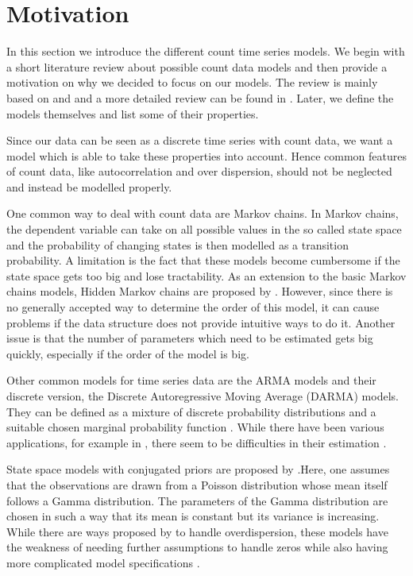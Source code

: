 \section{Motivation}
\label{sec:Ingarch Motivation}

In this section we introduce the different count time series models. We begin with a short literature review about possible count data models and then provide a motivation on why we decided to focus on our models. The review is mainly based on \cite{Liboschik:2016} and \cite{Heinen:2003} and a more detailed review can be found in \cite{Zucchini:1997}. Later, we define the models themselves and list some of their properties. 

Since our data can be seen as a discrete time series with count data, we want a model which is able to take these properties into account. Hence common features of count data, like autocorrelation and over dispersion, should not be neglected and instead be modelled properly.
 
One common way to deal with count data are Markov chains. In Markov chains, the dependent variable can take on all possible values in the so called state space and the probability of changing states is then modelled as a transition probability. A limitation is the fact that these models become cumbersome if the state space gets too big and lose tractability. As an extension to the basic Markov chains models, Hidden Markov chains are proposed by \cite{Zucchini:1997}. However, since there is no generally accepted way to determine the order of this model, it can cause problems if the data structure does not provide intuitive ways to do it. Another issue is that the number of parameters which need to be estimated gets big quickly, especially if the order of the model is big. 

Other common models for time series data are the ARMA models and their discrete version, the Discrete Autoregressive Moving Average (DARMA) models. They can be defined as a mixture of discrete probability distributions and a suitable chosen marginal probability function \cite{Biswas:2009}. While there have been various applications, for example in \cite{Chang:1987}, there seem to be difficulties in their estimation \cite{Heinen:2003}. 

State space models with conjugated priors are proposed by \cite{Harvey:1989}.Here, one assumes that the observations are drawn from a Poisson distribution whose mean itself follows a Gamma distribution. The parameters of the Gamma distribution are chosen in such a way that its mean is constant but its variance is increasing. While there are ways proposed by \cite{Qaqish:1988} to handle overdispersion, these models have the weakness of needing further assumptions to handle zeros while also having more complicated model specifications \cite{Heinen:2003}.

